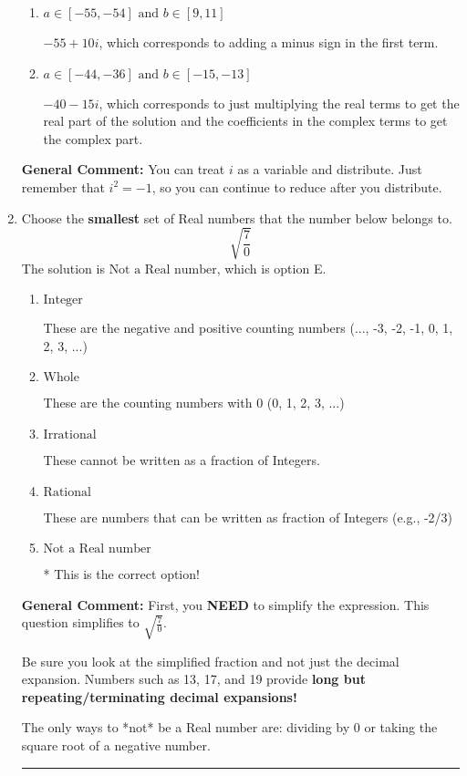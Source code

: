\documentclass{extbook}[14pt]
\newcommand{\litem}[1]{\item #1

\rule{\textwidth}{0.4pt}}
\begin{document}
\begin{enumerate}
{\begin{enumerate}[label=\Alph*.]
 $-55 - 10 i$, which corresponds to adding a minus sign in the second term.
\item \( a \in [-55, -54] \text{ and } b \in [9, 11] \)

 $-55 + 10 i$, which corresponds to adding a minus sign in the first term.
\item \( a \in [-44, -36] \text{ and } b \in [-15, -13] \)

 $-40 - 15 i$, which corresponds to just multiplying the real terms to get the real part of the solution and the coefficients in the complex terms to get the complex part.
\end{enumerate}

\textbf{General Comment:} You can treat $i$ as a variable and distribute. Just remember that $i^2=-1$, so you can continue to reduce after you distribute.
}
\litem{
Choose the \textbf{smallest} set of Real numbers that the number below belongs to.
\[ \sqrt{\frac{7}{0}} \]
The solution is \( \text{Not a Real number} \), which is option E.\begin{enumerate}[label=\Alph*.]
\item \( \text{Integer} \)

These are the negative and positive counting numbers (..., -3, -2, -1, 0, 1, 2, 3, ...)
\item \( \text{Whole} \)

These are the counting numbers with 0 (0, 1, 2, 3, ...)
\item \( \text{Irrational} \)

These cannot be written as a fraction of Integers.
\item \( \text{Rational} \)

These are numbers that can be written as fraction of Integers (e.g., -2/3)
\item \( \text{Not a Real number} \)

* This is the correct option!
\end{enumerate}

\textbf{General Comment:} First, you \textbf{NEED} to simplify the expression. This question simplifies to $\sqrt{\frac{7}{0}}$. 
 
 Be sure you look at the simplified fraction and not just the decimal expansion. Numbers such as 13, 17, and 19 provide \textbf{long but repeating/terminating decimal expansions!} 
 
 The only ways to *not* be a Real number are: dividing by 0 or taking the square root of a negative number. 
 
}
\end{enumerate}
\end{document}
